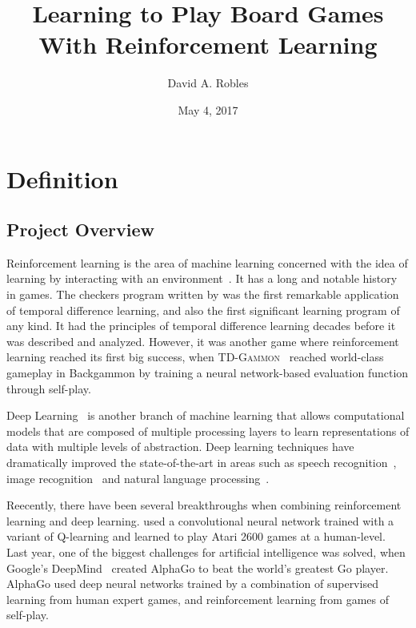 \documentclass{article}
\title{Learning to Play Board Games With Reinforcement Learning}
\author{David A. Robles}
\date{May 4, 2017}
\begin{document}
\maketitle

\section{Definition}

\subsection{Project Overview}

Reinforcement learning is the area of machine learning concerned with the idea of learning by
interacting with an environment~\citep{Sutton1998RL}. It has a long and notable history in games.
The checkers program written by \citet{Samuel1959Checkers} was the first remarkable application of
temporal difference learning, and also the first significant learning program of any kind. It had
the principles of temporal difference learning decades before it was described and analyzed.
However, it was another game where reinforcement learning reached its first big success, when
\textsc{TD-Gammon}~\citep{Tesauro1995TD} reached world-class gameplay in Backgammon by training a
neural network-based evaluation function through self-play.

Deep Learning~\citep{LeCun2015Nature} is another branch of machine learning that allows
computational models that are composed of multiple processing layers to learn representations of
data with multiple levels of abstraction. Deep learning techniques have dramatically improved the
state-of-the-art in areas such as speech recognition~\citep{Hinton2012Speech}, image
recognition~\citep{Krizhevsky2012ImageNet} and natural language processing~\citep{Colbert2012}.

Reecently, there have been several breakthroughs when combining reinforcement learning and deep
learning. \cite{Mnih2015AtariNature} used a convolutional neural network trained with a variant of
Q-learning and learned to play Atari 2600 games at a human-level. Last year, one of the biggest
challenges for artificial intelligence was solved, when Google's DeepMind~\citep{Silver2016GoNature}
created AlphaGo to beat the world's greatest Go player. AlphaGo used deep neural networks trained by
a combination of supervised learning from human expert games, and reinforcement learning from games
of self-play.
\end{document}

